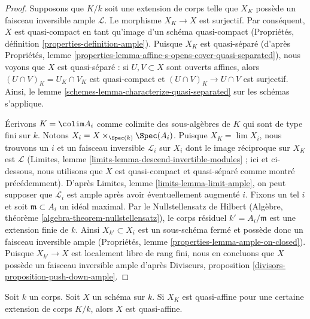 \begin{proof}
Supposons que $K/k$ soit une extension de corps telle que
$X_K$ possède un faisceau inversible ample $\mathcal{L}$. Le
morphisme $X_K \to X$ est surjectif. Par conséquent, $X$ est
quasi-compact en tant qu'image d'un schéma quasi-compact
(Propriétés, définition \ref{properties-definition-ample}).
Puisque $X_K$ est quasi-séparé (d'après Propriétés, lemme
\ref{properties-lemma-affine-s-opens-cover-quasi-separated}), nous
voyons que $X$ est quasi-séparé : si $U, V \subset X$ sont ouverts
affines, alors $(U \cap V)_K = U_K \cap V_K$ est quasi-compact et
$(U \cap V)_K \to U \cap V$ est surjectif. Ainsi, le lemme
\ref{schemes-lemma-characterize-quasi-separated} sur les schémas s'applique.

\medskip\noindent
Écrivons $K = \colim A_i$ comme colimite des sous-algèbres de
$K$ qui sont de type fini sur $k$. Notons $X_i = X
\times_{\Spec(k)} \Spec(A_i)$. Puisque $X_K = \lim X_i$, nous
trouvons un $i$ et un faisceau inversible $\mathcal{L}_i$ sur
$X_i$ dont le image réciproque sur $X_K$ est $\mathcal{L}$
(Limites, lemme \ref{limits-lemma-descend-invertible-modules} ;
ici et ci-dessous, nous utilisons que $X$ est quasi-compact et
quasi-séparé comme montré précédemment). D'après Limites, lemme
\ref{limits-lemma-limit-ample}, on peut supposer que
$\mathcal{L}_i$ est ample après avoir éventuellement augmenté
$i$. Fixons un tel $i$ et soit $\mathfrak m \subset A_i$ un idéal
maximal. Par le Nullstellensatz de Hilbert (Algèbre, théorème
\ref{algebra-theorem-nullstellensatz}), le corps résiduel $k' =
A_i/\mathfrak m$ est une extension finie de $k$. Ainsi $X_{k'}
\subset X_i$ est un sous-schéma fermé et possède donc un faisceau
inversible ample (Propriétés, lemme
\ref{properties-lemma-ample-on-closed}). Puisque $X_{k'} \to X$ est localement
libre de rang fini, nous en concluons que $X$ possède un faisceau inversible
ample d’après Diviseurs, proposition \ref{divisors-proposition-push-down-ample}.
\end{proof}

\begin{lemma}
\label{lemma-quasi-affine-after-field-extension}
Soit $k$ un corps. Soit $X$ un schéma sur $k$. Si $X_K$ est
quasi-affine pour une certaine extension de corps $K/k$, alors $X$ est quasi-affine.
\end{lemma}

